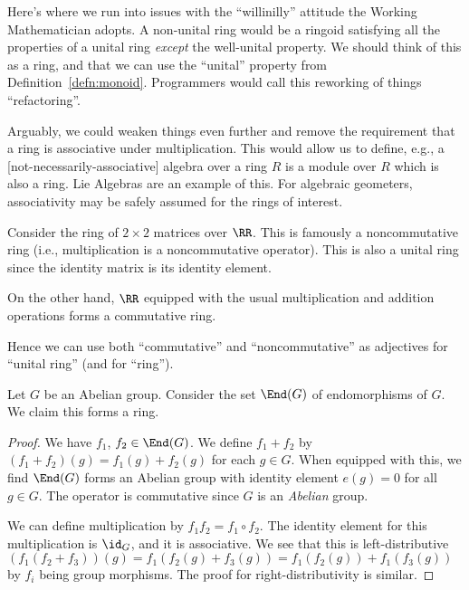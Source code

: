 \begin{remark}
Here's where we run into issues with the ``willinilly'' attitude the
Working Mathematician adopts. A non-unital ring would be a ringoid
satisfying all the properties of a unital ring \emph{except} the
well-unital property. We should think of this as a ring, and that
we can use the ``unital'' property from Definition~\ref{defn:monoid}.
Programmers would call this reworking of things ``refactoring''.

Arguably, we could weaken things even further and remove the
requirement that a ring is associative under multiplication. This
would allow us to define, e.g., a [not-necessarily-associative]
algebra over a ring $R$ is a module over $R$ which is also a ring.
Lie Algebras are an example of this. For algebraic geometers,
associativity may be safely assumed for the rings of interest.
\end{remark}

\begin{example}
Consider the ring of $2\times 2$ matrices over $\RR$. This is famously
a noncommutative ring (i.e., multiplication is a noncommutative operator).
This is also a unital ring since the identity matrix is its identity
element. 

On the other hand, $\RR$ equipped with the usual multiplication and
addition operations forms a commutative ring.

Hence we can use both ``commutative'' and ``noncommutative'' as
adjectives for ``unital ring'' (and for ``ring'').
\end{example}

\begin{example}
Let $G$ be an Abelian group.
Consider the set $\End(G)$ of endomorphisms of $G$. We claim this
forms a ring.

\begin{proof}
We have $f_{1}$, $f_{2}\in\End(G)$. We define $f_{1}+f_{2}$ by
$(f_{1}+f_{2})(g)=f_{1}(g)+f_{2}(g)$ for each $g\in G$. When equipped
with this, we find $\End(G)$ forms an Abelian group with identity
element $e(g)=0$ for all $g\in G$. The operator is commutative since
$G$ is an \emph{Abelian} group.

We can define multiplication by $f_{1}f_{2} = f_{1}\circ f_{2}$. The
identity element for this multiplication is $\id_{G}$, and it is
associative. We see that this is left-distributive
$(f_{1}(f_{2}+f_{3}))(g)=f_{1}(f_{2}(g)+f_{3}(g))=f_{1}(f_{2}(g))+f_{1}(f_{3}(g))$ 
by $f_{i}$ being group morphisms. The proof for right-distributivity
is similar.
\end{proof}
\end{example}

